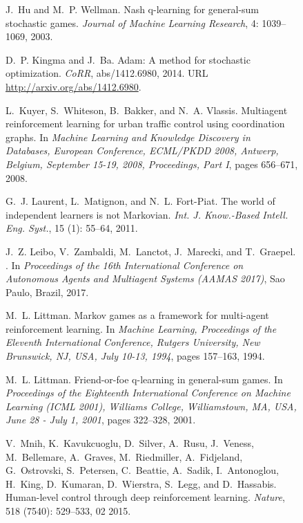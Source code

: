 \documentclass{article}
\begin{document}
\begin{SCfigure}
\begin{thebibliography}{40}
J.~Hu and M.~P. Wellman.
\newblock Nash q-learning for general-sum stochastic games.
\newblock \emph{Journal of Machine Learning Research}, 4: 1039--1069,
  2003.

D.~P. Kingma and J.~Ba.
\newblock Adam: {A} method for stochastic optimization.
\newblock \emph{CoRR}, abs/1412.6980, 2014.
\newblock URL \url{http://arxiv.org/abs/1412.6980}.

L.~Kuyer, S.~Whiteson, B.~Bakker, and N.~A. Vlassis.
\newblock Multiagent reinforcement learning for urban traffic control using
  coordination graphs.
\newblock In \emph{Machine Learning and Knowledge Discovery in Databases,
  European Conference, {ECML/PKDD} 2008, Antwerp, Belgium, September 15-19,
  2008, Proceedings, Part {I}}, pages 656--671, 2008.

G.~J. Laurent, L.~Matignon, and N.~L. Fort-Piat.
\newblock The world of independent learners is not {M}arkovian.
\newblock \emph{Int. J. Know.-Based Intell. Eng. Syst.}, 15
  (1): 55--64, 2011.

J.~Z. Leibo, V.~Zambaldi, M.~Lanctot, J.~Marecki, and T.~Graepel.
.
\newblock In \emph{Proceedings of the 16th International Conference on
  Autonomous Agents and Multiagent Systems (AAMAS 2017)}, Sao Paulo, Brazil,
  2017.

M.~L. Littman.
\newblock Markov games as a framework for multi-agent reinforcement learning.
\newblock In \emph{Machine Learning, Proceedings of the Eleventh International
  Conference, Rutgers University, New Brunswick, NJ, USA, July 10-13, 1994},
  pages 157--163, 1994.

M.~L. Littman.
\newblock Friend-or-foe q-learning in general-sum games.
\newblock In \emph{Proceedings of the Eighteenth International Conference on
  Machine Learning {(ICML} 2001), Williams College, Williamstown, MA, USA, June
  28 - July 1, 2001}, pages 322--328, 2001.

V.~Mnih, K.~Kavukcuoglu, D.~Silver, A.~Rusu, J.~Veness, M.~Bellemare,
  A.~Graves, M.~Riedmiller, A.~Fidjeland, G.~Ostrovski, S.~Petersen,
  C.~Beattie, A.~Sadik, I.~Antonoglou, H.~King, D.~Kumaran, D.~Wierstra,
  S.~Legg, and D.~Hassabis.
\newblock Human-level control through deep reinforcement learning.
\newblock \emph{Nature}, 518 (7540): 529--533, 02 2015.


\end{thebibliography}
\end{SCfigure}
\end{document}
